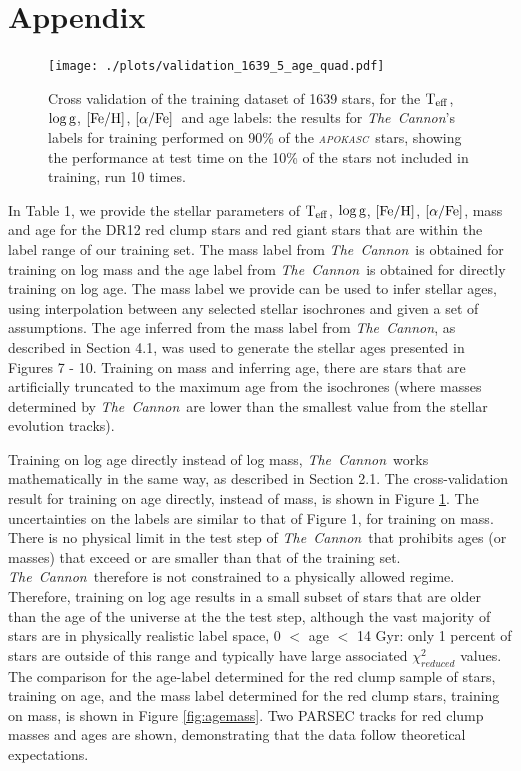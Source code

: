 \documentclass[12pt, preprint]{aastex}
\newcommand{\project}[1]{\textsl{#1}}
\newcommand{\tc}{\project{The~Cannon}}
\newcommand{\apokasc}{\project{\textsc{apokasc}}}
\newcommand{\teff}{\mbox{$\rm T_{eff}$}}
\newcommand{\feh}{\mbox{$\rm [Fe/H]$}}
\newcommand{\alphafe}{\mbox{$\rm [\alpha/Fe]$}}
\newcommand{\logg}{\mbox{$\rm \log g$}}
\begin{document}
\section*{Appendix}

\begin{figure}[h!]
\centering
        \texttt{[image: ./plots/validation\_1639\_5\_age\_quad.pdf]}
  \caption{Cross validation of the training dataset of 1639 stars, for the \teff, \logg, \feh, \alphafe\ and age labels: the results for \tc's labels for training performed on 90\% of the \apokasc\ stars, showing the performance at test time on the 10\% of the stars not included in training, run 10 times.}
\label{fig:validation2}
\end{figure}


In Table 1, we provide the stellar parameters of \teff, \logg, \feh, \alphafe, mass and age for the DR12 red clump stars and red giant stars that are within the label range of our training set. The mass label from \tc\ is obtained for training on log mass and the age label from \tc\ is obtained for directly training on log age.  The mass label we provide can be used to infer stellar ages, using interpolation between any selected stellar isochrones and given a set of assumptions. The age inferred from the mass label from \tc, as described in Section 4.1, was used to generate the stellar ages presented in Figures 7 - 10. Training on mass and inferring age, there are stars that are artificially truncated to the maximum age from the isochrones (where masses determined by \tc\ are lower than the smallest value from the stellar evolution tracks). 

Training on log age directly instead of log mass,  \tc\ works mathematically in the same way, as described in Section 2.1. The cross-validation result for training on age directly, instead of mass, is shown in Figure \ref{fig:validation2}. The uncertainties on the labels are similar to that of Figure 1, for training on mass. There is no physical limit in the test step of \tc\ that prohibits ages (or masses) that exceed or are smaller than that of the training set. 
\tc\ therefore is not constrained to a physically allowed regime. Therefore, training on log age results in a small subset of stars that are older than the age of the universe at the the test step, although the vast majority of stars are in physically realistic label space, 0 $<$ age $<$ 14 Gyr: only 1 percent of stars are outside of this range and typically have large associated $\chi^2_{reduced}$ values.  The comparison for the age-label determined for the red clump sample of stars, training on age, and the mass label determined for the red clump stars, training on mass, is shown in Figure \ref{fig:agemass}. Two PARSEC tracks for red clump masses and ages are shown, demonstrating that the data follow theoretical expectations. 
\end{document}
